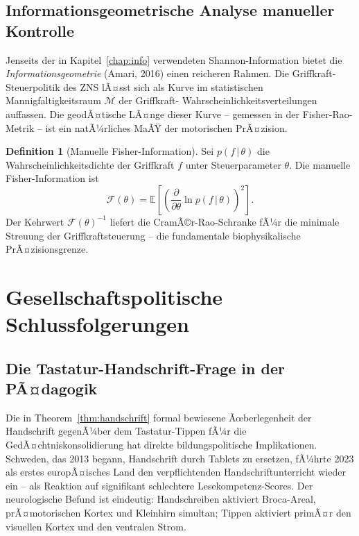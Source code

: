 ﻿\documentclass[12pt,a4paper]{report}
\theoremstyle{plain}
\theoremstyle{definition}
\newtheorem{definition}[theorem]{Definition}
\theoremstyle{remark}
\begin{document}
\subsection{Informationsgeometrische Analyse manueller Kontrolle}

Jenseits der in Kapitel~\ref{chap:info} verwendeten Shannon-Information
bietet die \emph{Informationsgeometrie} (Amari, 2016) einen reicheren
Rahmen. Die Griffkraft-Steuerpolitik des ZNS lÃ¤sst sich als Kurve im
statistischen Mannigfaltigkeitsraum $\mathcal{M}$ der Griffkraft-
Wahrscheinlichkeitsverteilungen auffassen. Die geodÃ¤tische LÃ¤nge
dieser Kurve -- gemessen in der Fisher-Rao-Metrik -- ist ein natÃ¼rliches
MaÃŸ der motorischen PrÃ¤zision.

\begin{definition}[Manuelle Fisher-Information]
Sei $p(f\,|\,\theta)$ die Wahrscheinlichkeitsdichte der Griffkraft
$f$ unter Steuerparameter $\theta$. Die manuelle Fisher-Information ist
\begin{equation}
  \mathcal{F}(\theta) = \mathbb{E}\!\left[
    \left(\frac{\partial}{\partial\theta}\ln p(f\,|\,\theta)\right)^2
  \right].
\end{equation}
Der Kehrwert $\mathcal{F}(\theta)^{-1}$ liefert die CramÃ©r-Rao-Schranke
fÃ¼r die minimale Streuung der Griffkraftsteuerung -- die fundamentale
biophysikalische PrÃ¤zisionsgrenze.
\end{definition}

\section{Gesellschaftspolitische Schlussfolgerungen}

\subsection{Die Tastatur-Handschrift-Frage in der PÃ¤dagogik}

Die in Theorem~\ref{thm:handschrift} formal bewiesene Ãœberlegenheit der
Handschrift gegenÃ¼ber dem Tastatur-Tippen fÃ¼r die GedÃ¤chtniskonsolidierung
hat direkte bildungspolitische Implikationen. Schweden, das 2013 begann,
Handschrift durch Tablets zu ersetzen, fÃ¼hrte 2023 als erstes europÃ¤isches
Land den verpflichtenden Handschriftunterricht wieder ein -- als Reaktion
auf signifikant schlechtere Lesekompetenz-Scores. Der neurologische
Befund ist eindeutig: Handschreiben aktiviert Broca-Areal, prÃ¤motorischen
Kortex und Kleinhirn simultan; Tippen aktiviert primÃ¤r den visuellen
Kortex und den ventralen Strom.
\end{document}

